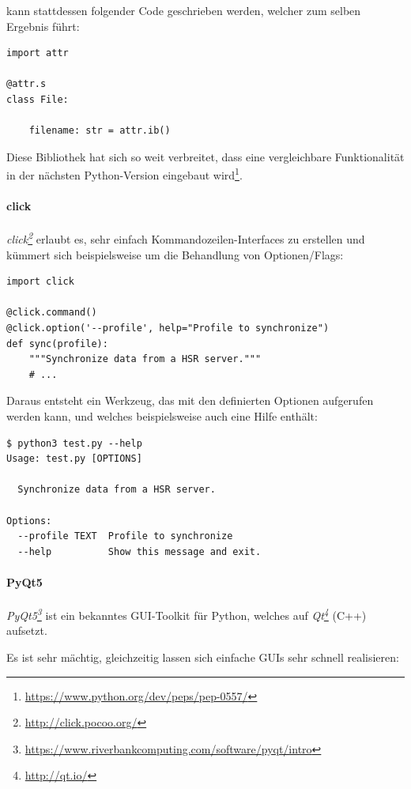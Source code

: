 \documentclass[a4paper]{article}
\newcommand{\tool}[2]{\emph{#1\footnote{\url{#2}}}}
\begin{document}
kann stattdessen folgender Code geschrieben werden, welcher zum selben Ergebnis führt:

\begin{verbatim}
import attr

@attr.s
class File:

    filename: str = attr.ib()
\end{verbatim}

Diese Bibliothek hat sich so weit verbreitet, dass eine vergleichbare
Funktionalität in der nächsten Python-Version eingebaut  wird\footnote{\url{https://www.python.org/dev/peps/pep-0557/}}.

\paragraph{click}

\tool{click}{http://click.pocoo.org/} erlaubt es, sehr einfach
Kommandozeilen-Interfaces zu erstellen und kümmert sich beispielsweise um die
Behandlung von Optionen/Flags:

\begin{verbatim}
import click

@click.command()
@click.option('--profile', help="Profile to synchronize")
def sync(profile):
    """Synchronize data from a HSR server."""
    # ...
\end{verbatim}

Daraus entsteht ein Werkzeug, das mit den definierten Optionen aufgerufen
werden kann, und welches beispielsweise auch eine Hilfe enthält:

\pagebreak
\begin{verbatim}
$ python3 test.py --help
Usage: test.py [OPTIONS]

  Synchronize data from a HSR server.

Options:
  --profile TEXT  Profile to synchronize
  --help          Show this message and exit.
\end{verbatim}

\paragraph{PyQt5}

\tool{PyQt5}{https://www.riverbankcomputing.com/software/pyqt/intro} ist ein
bekanntes GUI-Toolkit für Python, welches auf \tool{Qt}{http://qt.io/} (C++) aufsetzt.

Es ist sehr mächtig, gleichzeitig lassen sich einfache GUIs sehr schnell
realisieren:
\end{document}
